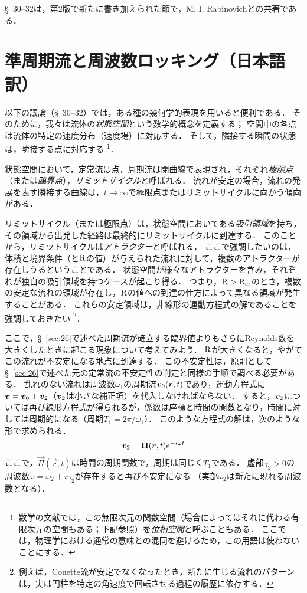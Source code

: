 \begin{details}
\S~30--32は，第2版で新たに書き加えられた節で，M. I. Rabinovichとの共著である．
\end{details}

\section{\spade 準周期流と周波数ロッキング（日本語訳）}
以下の議論（\S~30--32）では，ある種の幾何学的表現を用いると便利である．
そのために，我々は流体の\emph{状態空間}という数学的概念を定義する；
空間中の各点は流体の特定の速度分布（速度場）に対応する．
そして，隣接する瞬間の状態は，隣接する点に対応する
\footnote{
数学の文献では，この無限次元の関数空間（場合によってはそれに代わる有限次元の空間もある；下記参照）を\emph{位相空間}と呼ぶこともある．
ここでは，物理学における通常の意味との混同を避けるため，この用語は使わないことにする．}．



状態空間において，定常流は点，周期流は閉曲線で表現され，それぞれ\emph{極限点}（または\emph{臨界点}），\emph{リミットサイクル}と呼ばれる．
流れが安定の場合，流れの発展を表す隣接する曲線は，$t\to\infty$で極限点またはリミットサイクルに向かう傾向がある．



リミットサイクル（または極限点）は，状態空間においてある\emph{吸引領域}を持ち，その領域から出発した経路は最終的にリミットサイクルに到達する．
このことから，リミットサイクルは\emph{アトラクター}と呼ばれる．
ここで強調したいのは，体積と境界条件（と$\mathrm{R}$の値）が与えられた流れに対して，複数のアトラクターが存在しうるということである．
状態空間が様々なアトラクターを含み，それぞれが独自の吸引領域を持つケースが起こり得る．
つまり，$\mathrm{R}>\mathrm{R}_{\mathrm{cr}}$のとき，複数の安定な流れの領域が存在し，$\mathrm{R}$の値への到達の仕方によって異なる領域が発生することがある．
これらの安定領域は，非線形の運動方程式の解であることを強調しておきたい
\footnote{例えば，Couette流が安定でなくなったとき，新たに生じる流れのパターンは，実は円柱を特定の角速度で回転させる過程の履歴に依存する．}．


ここで，\S~\ref{sec:26}で述べた周期流が確立する臨界値よりもさらにReynolds数を大きくしたときに起こる現象について考えてみよう．
$\mathrm{R}$が大きくなると，やがてこの流れが不安定になる地点に到達する．
この不安定性は，原則として\S~\ref{sec:26}で述べた元の定常流の不安定性の判定と同様の手順で調べる必要がある．
乱れのない流れは周波数$\omega_1$の周期流$\vb*{v}_0(\vb*{r},t)$であり，運動方程式に$\vb*{v}=\vb*{v}_0+\vb*{v}_2$（$\vb*{v}_2$は小さな補正項）を代入しなければならない．
すると，$\vb*{v}_2$については再び線形方程式が得られるが，係数は座標と時間の関数となり，時間に対しては周期的になる（周期$T_1=2\pi/\omega_1$）．
このような方程式の解は，次のような形で求められる．
\begin{equation}\label{eq30.1:周期的な摂動v2}
    \vb*{v}_2 = \vb*{\Pi}(\vb*{r},t) e^{-i\omega t}
\end{equation} 
ここで，$\vec{\Pi}(\vec{r},t)$は時間の周期関数で，周期は同じく$T_1$である．
虚部$\gamma_2>0$の周波数$\omega=\omega_2+i\gamma_2$が存在すると再び不安定になる
（実部$\omega_2$は新たに現れる周波数となる）．



